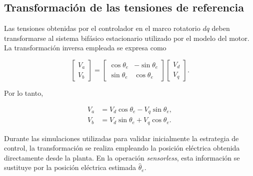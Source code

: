 \subsection{Transformación de las tensiones de referencia}
\label{subsec:transformacion_tensiones}

Las tensiones obtenidas por el controlador en el marco rotatorio $dq$
deben transformarse al sistema bifásico estacionario utilizado por el
modelo del motor. La transformación inversa empleada se expresa como

\begin{equation}
\begin{bmatrix}
V_a\\
V_b
\end{bmatrix}
=
\begin{bmatrix}
\cos\theta_e & -\sin\theta_e\\
\sin\theta_e & \cos\theta_e
\end{bmatrix}
\begin{bmatrix}
V_d\\
V_q
\end{bmatrix}.
\label{eq:transformacion_inversa_control}
\end{equation}

Por lo tanto,

\begin{align}
V_a
&=
V_d\cos\theta_e
-
V_q\sin\theta_e,
\\
V_b
&=
V_d\sin\theta_e
+
V_q\cos\theta_e.
\end{align}

Durante las simulaciones utilizadas para validar inicialmente la
estrategia de control, la transformación se realiza empleando la
posición eléctrica obtenida directamente desde la planta. En la
operación \textit{sensorless}, esta información se sustituye por la
posición eléctrica estimada $\hat{\theta}_e$.



